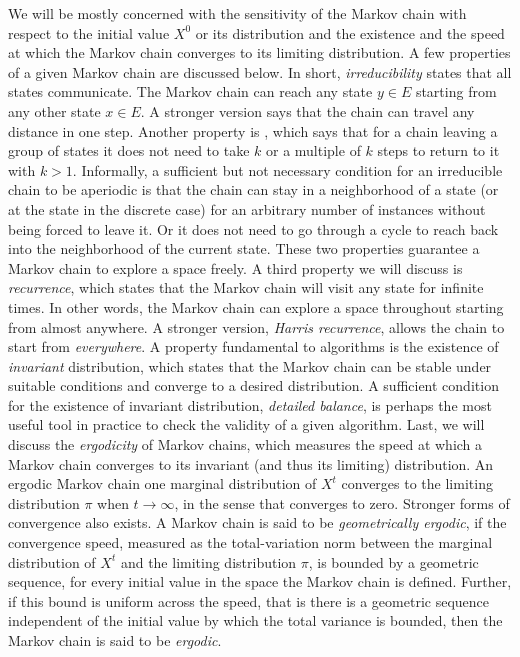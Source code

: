 We will be mostly concerned with the sensitivity of the Markov chain with respect to the initial value $X^0$ or its distribution and the existence and the speed at which the Markov chain converges to its limiting distribution. A few properties of a given Markov chain are discussed below. In short, \emph{irreducibility} states that all states communicate. The Markov chain can reach any state $y\in E$ starting from any other state $x\in E$. A stronger version says that the chain can travel any distance in one step. Another property is \emph{}, which says that for a chain leaving a group of states it does not need to take $k$ or a multiple of $k$ steps to return to it with $k>1$. Informally, a sufficient but not necessary condition for an irreducible chain to be aperiodic is that the chain can stay in a neighborhood of a state (or at the state in the discrete case) for an arbitrary number of instances without being forced to leave it. Or it does not need to go through a cycle to reach back into the neighborhood of the current state. These two properties guarantee a Markov chain to explore a space freely. A third property we will discuss is \emph{recurrence}, which states that the Markov chain will visit any state for infinite times. In other words, the Markov chain can explore a space throughout starting from almost anywhere. A stronger version, \emph{Harris recurrence}, allows the chain to start from \emph{everywhere}. A property fundamental to \mcmc algorithms is the existence of \emph{invariant} distribution, which states that the Markov chain can be stable under suitable conditions and converge to a desired distribution. A sufficient condition for the existence of invariant distribution, \emph{detailed balance}, is perhaps the most useful tool in practice to check the validity of a given algorithm. Last, we will discuss the \emph{ergodicity} of Markov chains, which measures the speed at which a Markov chain converges to its invariant (and thus its limiting) distribution. An ergodic Markov chain  one  marginal distribution of $X^t$ converges to the limiting distribution $\pi$ when $t\to\infty$, in the sense that  converges to zero. Stronger forms of convergence also exists. A Markov chain is said to be \emph{geometrically ergodic}, if the convergence speed, measured as the total-variation norm between the marginal distribution of $X^t$ and the limiting distribution $\pi$, is bounded by a geometric sequence, for every initial value in the space the Markov chain is defined. Further, if this bound is uniform across the speed, that is there is a geometric sequence independent of the initial value by which the total variance is bounded, then the Markov chain is said to be \emph{ ergodic}.

